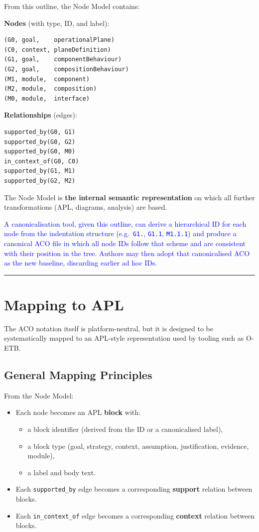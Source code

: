 \documentclass[11pt]{article}
\begin{document}
From this outline, the Node Model contains:

\textbf{Nodes} (with type, ID, and label):
\begin{verbatim}
(G0, goal,    operationalPlane)
(C0, context, planeDefinition)
(G1, goal,    componentBehaviour)
(G2, goal,    compositionBehaviour)
(M1, module,  component)
(M2, module,  composition)
(M0, module,  interface)
\end{verbatim}

\textbf{Relationships} (edges):
\begin{verbatim}
supported_by(G0, G1)
supported_by(G0, G2)
supported_by(G0, M0)
in_context_of(G0, C0)
supported_by(G1, M1)
supported_by(G2, M2)
\end{verbatim}

The Node Model is \textbf{the internal semantic representation} on which all further transformations (APL, diagrams, analysis) are based.

\textcolor{blue}{A canonicalisation tool, given this outline, can derive a hierarchical ID for each node from the indentation structure (e.g.\ \texttt{G1.}, \texttt{G1.1}, \texttt{M1.1.1}) and produce a canonical ACO file in which all node IDs follow that scheme and are consistent with their position in the tree. Authors may then adopt that canonicalised ACO as the new baseline, discarding earlier ad hoc IDs.}

\bigskip
\hrule
\bigskip

\section{Mapping to APL}

The ACO notation itself is platform-neutral, but it is designed to be systematically mapped to an APL-style representation used by tooling such as O-ETB.

\subsection{General Mapping Principles}

From the Node Model:
\begin{itemize}[leftmargin=2em]
  \item Each node becomes an APL \textbf{block} with:
  \begin{itemize}[leftmargin=1.5em]
    \item a block identifier (derived from the ID or a canonicalised label),
    \item a block type (goal, strategy, context, assumption, justification, evidence, module),
    \item a label and body text.
  \end{itemize}

  \item Each \texttt{supported\_by} edge becomes a corresponding \textbf{support} relation between blocks.

  \item Each \texttt{in\_context\_of} edge becomes a corresponding \textbf{context} relation between blocks.
\end{itemize}
\end{document}
